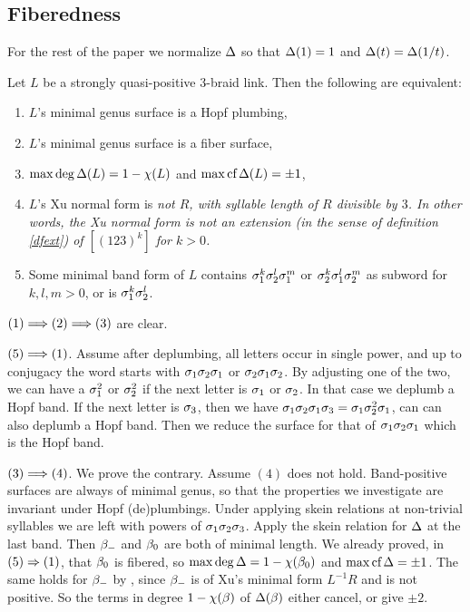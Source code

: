 \subsection{Fiberedness\label{ppp}}

For the rest of the paper we normalize
$\Delta$ so that $\Delta(1)=1$ and $\Delta(t)=\Delta(1/t)$.

\begin{theorem}\label{Thq}
Let $L$ be a strongly quasi-positive 3-braid link. Then the following
are equivalent:
\def\labelenumi{\theenumi)}
\begin{enumerate}
\item $L$'s minimal genus surface is a Hopf plumbing,
\item $L$'s minimal genus surface is a fiber surface,
\item $\max\deg\Delta(L)=1-\chi(L)$ and $\max\text{\rm cf}\,\Delta(L)=\pm 1$,
\item $L$'s Xu normal form is \em{not} $R$, with syllable
length of $R$ divisible by $3$. In other words, the Xu normal
form is not an extension (in the sense of definition
\ref{dfext}) of $[(123)^k]$ for $k>0$.
\item Some minimal band form of $L$ contains
$\sigma_1^k\sigma_2^l\sigma_1^m$ or $\sigma_2^k\sigma_1^l\sigma_2^m$
as subword for $k,l,m>0$, or is $\sigma_1^k\sigma_2^l$.
\end{enumerate}
\end{theorem}

\proof  $(1)\Longrightarrow (2)\Longrightarrow (3)$ are clear.

$(5)\Longrightarrow (1)$. Assume after deplumbing, all letters occur in single
power, and up to conjugacy the word starts with $\sigma_1\sigma_2\sigma_1$
or $\sigma_2\sigma_1\sigma_2$. By adjusting one of the two, we can have a
$\sigma_1^2$ or $\sigma_2^2$ if the next letter is $\sigma_1$ or $\sigma_2$. In
that case we deplumb a Hopf band. If the next letter is $\sigma_3$, then
we have $\sigma_1\sigma_2\sigma_1\sigma_3=\sigma_1\sigma_2^2\sigma_1$, can can also deplumb
a Hopf band. Then we reduce the surface for that of $\sigma_1\sigma_2\sigma_1$
which is the Hopf band.

$(3)\Longrightarrow (4)$. We prove the contrary. Assume $(4)$ does not hold. 
Band-positive surfaces are always of minimal genus, so that the
properties we investigate are invariant under Hopf (de)plumbings.
Under applying skein relations at non-trivial syllables we are
left with powers of $\sigma_1\sigma_2\sigma_3$. Apply the skein relation
for $\Delta$ at the last band. Then $\beta_{-}$ and $\beta_0$ are both
of minimal length. We already proved, in $(5)\Rightarrow (1)$, that
$\beta_0$ is fibered, so $\max\deg\Delta=1-\chi(\beta_0)$ and $\max\text{\rm cf}\,\Delta=\pm 1$.
The same holds for $\beta_{-}$ by \cite[proposition 2]{3br}, since 
$\beta_{-}$ is of Xu's minimal form $L^{-1}R$ and is not positive.
So the terms in degree $1-\chi(\beta)$ of $\Delta(\beta)$ either cancel, or
give $\pm 2$. 

